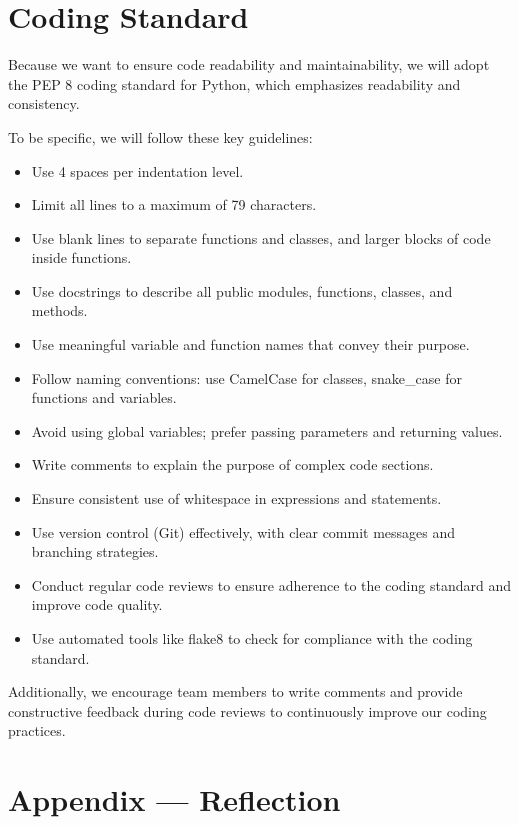 \documentclass{article}
\begin{document}

\section{Coding Standard}

Because we want to ensure code readability and maintainability,
we will adopt the PEP 8 coding standard for Python, which emphasizes readability and consistency.

To be specific, we will follow these key guidelines:
\begin{itemize}
  \item Use 4 spaces per indentation level.
  \item Limit all lines to a maximum of 79 characters.
  \item Use blank lines to separate functions and classes, and larger blocks of code inside functions.
  \item Use docstrings to describe all public modules, functions, classes, and methods.
  \item Use meaningful variable and function names that convey their purpose.
  \item Follow naming conventions: use CamelCase for classes, snake\_case for functions and variables.
  \item Avoid using global variables; prefer passing parameters and returning values.
  \item Write comments to explain the purpose of complex code sections.
  \item Ensure consistent use of whitespace in expressions and statements.
  \item Use version control (Git) effectively, with clear commit messages and branching strategies.
  \item Conduct regular code reviews to ensure adherence to the coding standard and improve code quality.
  \item Use automated tools like flake8 to check for compliance with the coding standard.
\end{itemize}

Additionally, we encourage team members to write comments and provide constructive feedback during code reviews
to continuously improve our coding practices.

\newpage{}

\section*{Appendix --- Reflection}
\end{document}
